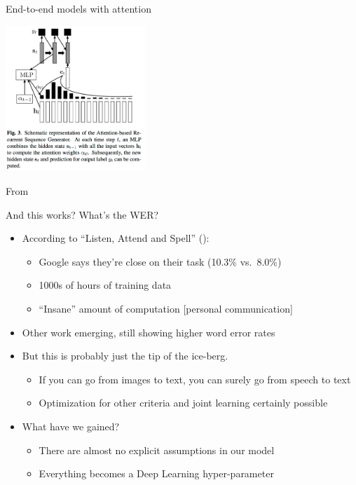 \begin{frame}{End-to-end models with attention}
  \begin{center}
    \includegraphics[height=55mm]{figures/att}
  \end{center}
  \tiny From \cite{BahdanauCSBB15}
\end{frame}

\begin{frame}{And this works? What's the WER?}
  \begin{itemize}
  \item According to ``Listen, Attend and Spell'' (\cite{las}):
    \begin{itemize}
    \item Google says they're close on their task (10.3\% vs.\ 8.0\%)
    \item 1000s of hours of training data
    \item ``Insane'' amount of computation [personal communication]
    \end{itemize}
  \item Other work emerging, still showing higher word error rates
  \item But this is probably just the tip of the ice-berg.
    \begin{itemize}
    \item If you can go from images to text, you can surely go from speech to text
      \item Optimization for other criteria and joint learning certainly possible
    \end{itemize}
  \item What have we gained?
    \begin{itemize}
    \item There are almost no explicit assumptions in our model
    \item Everything becomes a Deep Learning hyper-parameter
    \end{itemize}
  \end{itemize}
\end{frame}

